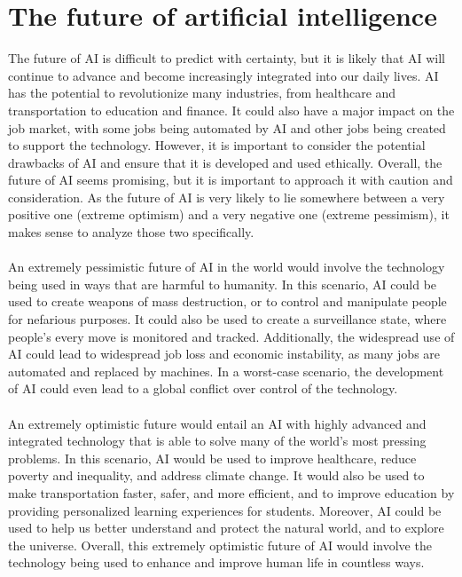 \section{The future of artificial intelligence}
The future of AI is difficult to predict with certainty, but it is likely that AI will continue to advance and become increasingly integrated into our daily lives. AI has the potential to revolutionize many industries, from healthcare and transportation to education and finance. It could also have a major impact on the job market, with some jobs being automated by AI and other jobs being created to support the technology. However, it is important to consider the potential drawbacks of AI and ensure that it is developed and used ethically. Overall, the future of AI seems promising, but it is important to approach it with caution and consideration. As the future of AI is very likely to lie somewhere between a very positive one (extreme optimism) and a very negative one (extreme pessimism), it makes sense to analyze those two specifically.
\\
\\
An extremely pessimistic future of AI in the world would involve the technology being used in ways that are harmful to humanity. In this scenario, AI could be used to create weapons of mass destruction, or to control and manipulate people for nefarious purposes. It could also be used to create a surveillance state, where people's every move is monitored and tracked. Additionally, the widespread use of AI could lead to widespread job loss and economic instability, as many jobs are automated and replaced by machines. In a worst-case scenario, the development of AI could even lead to a global conflict over control of the technology.
\\
\\
An extremely optimistic future would entail an AI with highly advanced and integrated technology that is able to solve many of the world's most pressing problems. In this scenario, AI would be used to improve healthcare, reduce poverty and inequality, and address climate change. It would also be used to make transportation faster, safer, and more efficient, and to improve education by providing personalized learning experiences for students. Moreover, AI could be used to help us better understand and protect the natural world, and to explore the universe. Overall, this extremely optimistic future of AI would involve the technology being used to enhance and improve human life in countless ways.



